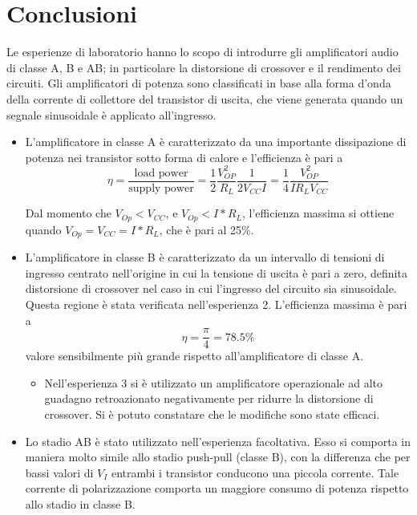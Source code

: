 \section{Conclusioni}
Le esperienze di laboratorio hanno lo scopo di introdurre gli amplificatori audio di classe A, B e AB; in particolare la distorsione di crossover e il rendimento dei circuiti. Gli amplificatori di potenza sono classificati in base alla forma d’onda della corrente di collettore del transistor di uscita, che viene generata quando un segnale sinusoidale è applicato all’ingresso.\\
\begin{itemize}
    \item L'amplificatore in classe A è caratterizzato da una importante dissipazione di potenza nei transistor sotto forma di calore e l'efficienza è pari a
\begin{equation}
    \eta=\frac{\text{load power}}{\text{supply power}}=\frac{1}{2}\frac{V_{OP}^2}{R_L}\frac{1}{2V_{CC}I}=\frac{1}{4}\frac{V_{OP}^2}{IR_LV_{CC}}
\end{equation}

Dal momento che $V_{Op} < V_{CC}$, e $V_{Op} < I*R_L$, l'efficienza massima si ottiene quando $V_{Op}=V_{CC}=I*R_L$, che è pari al 25\%.

    \item L'amplificatore in classe B è caratterizzato da un intervallo di tensioni di ingresso centrato nell'origine in cui la tensione di uscita è pari a zero, definita distorsione di crossover nel caso in cui l’ingresso del circuito sia sinusoidale. Questa regione è stata verificata nell'esperienza 2. L'efficienza massima è pari a 
\begin{equation}
    \eta=\frac{\pi}{4} = 78.5\%
\end{equation}
valore sensibilmente più grande rispetto all'amplificatore di classe A.
\begin{itemize}
    \item Nell'esperienza 3 si è utilizzato un amplificatore operazionale ad alto guadagno retroazionato negativamente per ridurre la distorsione di crossover. Si è potuto constatare che le modifiche sono state efficaci.
\end{itemize}
\item Lo stadio AB è stato utilizzato nell'esperienza facoltativa. Esso si comporta in maniera molto simile allo stadio push-pull
(classe B), con la differenza che per bassi valori di $V_I$ entrambi i transistor conducono una piccola corrente. Tale corrente di polarizzazione comporta un maggiore consumo di potenza rispetto allo stadio in classe B.
\end{itemize}
